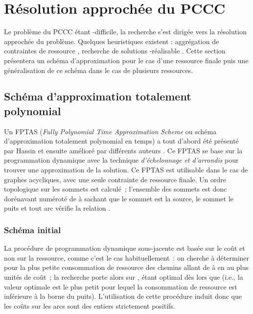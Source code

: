 \documentclass[10pt,francais]{llncs}
\begin{document}
\section{R\'esolution approch\'ee du PCCC}\label{sec-approx}

Le probl\`eme du PCCC \'etant -difficile, la recherche s'est dirig\'ee vers la r\'esolution approch\'ee du probl\`eme. Quelques heuristiques existent : aggr\'egation de contraintes de ressource \cite{Nagih2005}, recherche de solutions -r\'ealisable \cite{Avella2002}. Cette section pr\'esentera un sch\'ema d'approximation pour le cas d'une ressource finale puis une g\'en\'eralisation de ce sch\'ema dans le cas de plusieurs ressources.

\subsection{Sch\'ema d'approximation totalement polynomial}\label{sub-approx-fptas}
Un FPTAS ({\em Fully Polynomial Time Approximation Scheme} ou sch\'ema d'approximation totalement polynomial en temps) a tout d'abord \'et\'e pr\'esent\'e par Hassin \cite{Hassin1992} et ensuite am\'elior\'e par diff\'erents auteurs \cite{Phillips1993,Lorenz2001,Ergun2002}. Ce FPTAS se base sur la programmation dynamique avec la technique {\em d'\'echelonnage et d'arrondis} pour trouver une approximation de la solution. Ce FPTAS est utilisable dans le cas de graphes acycliques, avec une seule contrainte de ressource finale. Un ordre topologique sur les sommets est calcul\'e~; l'ensemble des sommets est donc dor\'enavant num\'erot\'e de  \`a  sachant que le sommet  est la source, le sommet  le puits et tout arc  v\'erifie la relation .

\subsubsection{Sch\'ema initial}\label{subsub-approx-fptas-hassin}
La proc\'edure de programmation dynamique sous-jacente est bas\'ee sur le co\^ut et non sur la ressource, comme c'est le cas habituellement~: on cherche \`a d\'eterminer pour  la plus petite consommation de ressource des chemins allant de  \`a  en au plus  unit\'es de co\^ut~; la recherche porte alors sur ,  \'etant optimal d\`es lors que  (i.e., la valeur optimale est le plus petit  pour lequel la consommation de ressource est inf\'erieure \`a la borne du puits). L'utilisation de cette proc\'edure induit donc que les co\^uts sur les arcs sont des entiers strictement positifs.
\end{document}
